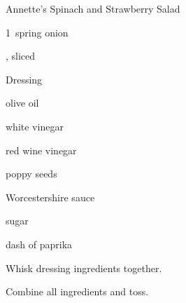 \begin{recipe}{Annette's Spinach and Strawberry Salad}{}{}

\begin{ingredients}
\item 1~spring onion
\item {}, sliced
\item {}
\end{ingredients}
Dressing
\begin{ingredients}
\item \C{\half} olive oil
\item {} white vinegar
\item {} red wine vinegar
\item {} poppy seeds
\item {} Worcestershire sauce
\item \C{\quarter} sugar
\item dash of paprika
\end{ingredients}

\begin{directions}
\item Whisk dressing ingredients together.
\item Combine all ingredients and toss.
\end{directions}

\end{recipe}
